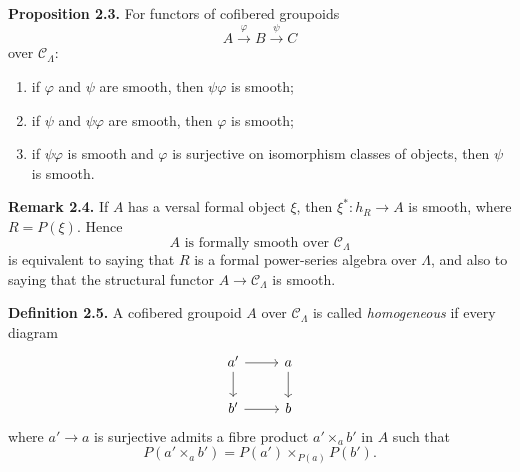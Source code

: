 \documentclass[11pt]{article}
\begin{document}
\textbf{Proposition 2.3.} For functors of cofibered groupoids
\[
 A\xrightarrow{\varphi}B\xrightarrow{\psi}C
\]
over \(\mathcal C_\Lambda\):
\begin{enumerate}[label=(\alph*)]
\item if \(\varphi\) and \(\psi\) are smooth, then \(\psi\varphi\) is smooth;
\item if \(\psi\) and \(\psi\varphi\) are smooth, then \(\varphi\) is smooth;
\item if \(\psi\varphi\) is smooth and \(\varphi\) is surjective on isomorphism classes
of objects, then \(\psi\) is smooth.
\end{enumerate}

\textbf{Remark 2.4.} If \(A\) has a versal formal object \(\xi\), then
\(\xi^\ast:h_R\to A\) is smooth, where \(R=P(\xi)\). Hence
\[
 A\text{ is formally smooth over }\mathcal C_\Lambda
\]
is equivalent to saying that \(R\) is a formal power-series algebra over \(\Lambda\),
and also to saying that the structural functor \(A\to\mathcal C_\Lambda\) is smooth.

\textbf{Definition 2.5.} A cofibered groupoid \(A\) over \(\mathcal C_\Lambda\) is called
\emph{homogeneous} if every diagram
\[
\begin{tikzcd}
a' \arrow[r] \arrow[d] & a \arrow[d]\\
b' \arrow[r] & b
\end{tikzcd}
\]
where \(a'\to a\) is surjective admits a fibre product \(a'\times_a b'\) in \(A\) such
that
\[
 P(a'\times_a b')=P(a')\times_{P(a)}P(b').
\]
\end{document}
